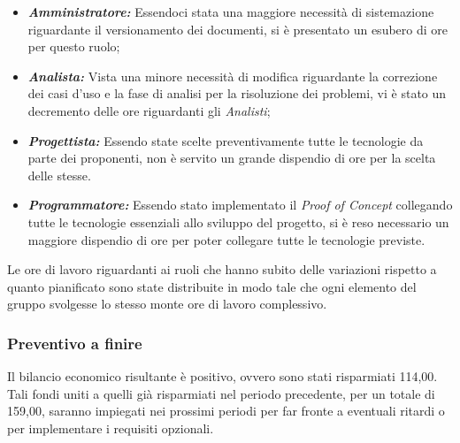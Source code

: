 \begin{itemize}
    \item \textbf{\textit{Amministratore:}} Essendoci stata una maggiore necessità di sistemazione riguardante il versionamento dei documenti, si è presentato un esubero di ore per questo ruolo;
    \item \textbf{\textit{Analista:}} Vista una minore necessità di modifica riguardante la correzione dei casi d'uso e la fase di analisi per la risoluzione dei problemi, vi è stato un decremento delle ore riguardanti gli \textit{Analisti};
    \item \textbf{\textit{Progettista:}} Essendo state scelte preventivamente tutte le tecnologie da parte dei proponenti, non è servito un grande dispendio di ore per la scelta delle stesse.
    \item \textbf{\textit{Programmatore:}} Essendo stato implementato il \textit{Proof of Concept} collegando tutte le tecnologie essenziali allo sviluppo del progetto, si è reso necessario un maggiore dispendio di ore per poter collegare tutte le tecnologie previste.
\end{itemize}

Le ore di lavoro riguardanti ai ruoli che hanno subito delle variazioni rispetto a quanto pianificato sono state distribuite in modo tale che ogni elemento del gruppo svolgesse lo stesso monte ore di lavoro complessivo.

\subsubsection{Preventivo a finire} Il bilancio economico risultante è positivo, ovvero sono stati risparmiati 114,00\EURdig. Tali fondi uniti a quelli già risparmiati nel periodo precedente, per un totale di 159,00\EurDig, saranno impiegati nei prossimi periodi per far fronte a eventuali ritardi o per implementare i requisiti opzionali.
